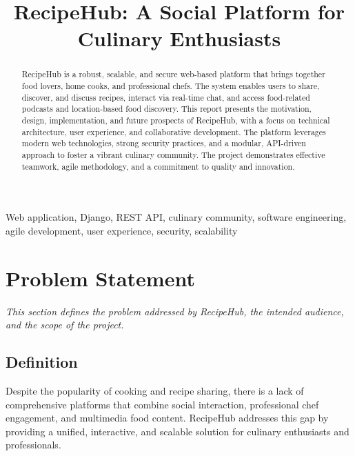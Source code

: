 \documentclass[conference]{IEEEtran}
\begin{document}
\title{RecipeHub: A Social Platform for Culinary Enthusiasts}
\author{
}
\maketitle

\begin{abstract}
RecipeHub is a robust, scalable, and secure web-based platform that brings together food lovers, home cooks, and professional chefs. The system enables users to share, discover, and discuss recipes, interact via real-time chat, and access food-related podcasts and location-based food discovery. This report presents the motivation, design, implementation, and future prospects of RecipeHub, with a focus on technical architecture, user experience, and collaborative development. The platform leverages modern web technologies, strong security practices, and a modular, API-driven approach to foster a vibrant culinary community. The project demonstrates effective teamwork, agile methodology, and a commitment to quality and innovation.
\end{abstract}

\begin{IEEEkeywords}
Web application, Django, REST API, culinary community, software engineering, agile development, user experience, security, scalability
\end{IEEEkeywords}

\section{Problem Statement}
\textit{This section defines the problem addressed by RecipeHub, the intended audience, and the scope of the project.}
\subsection{Definition}
Despite the popularity of cooking and recipe sharing, there is a lack of comprehensive platforms that combine social interaction, professional chef engagement, and multimedia food content. RecipeHub addresses this gap by providing a unified, interactive, and scalable solution for culinary enthusiasts and professionals.
\end{document}
